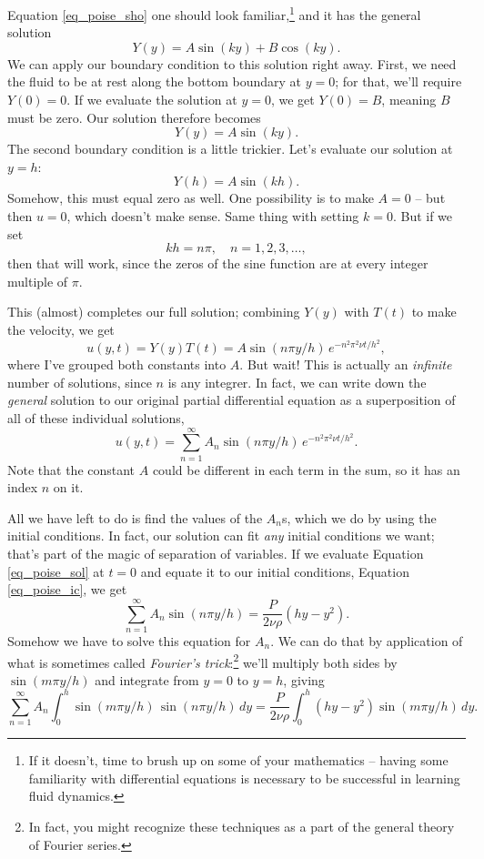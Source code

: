 Equation \ref{eq_poise_sho} one should look familiar,\footnote{If it doesn't, time to brush up on some of your mathematics -- having some familiarity with differential equations is necessary to be successful in learning fluid dynamics.} and it has the general solution
\[
Y(y) = A \sin (ky) + B \cos (ky).
\]
We can apply our boundary condition to this solution right away.  First, we need the fluid to be at rest along the bottom boundary at $y=0$; for that, we'll require $Y(0) = 0$.  If we evaluate the solution at $y=0$, we get $Y(0) = B$, meaning $B$ must be zero.  Our solution therefore becomes
\[
Y(y) = A \sin (ky).
\]
The second boundary condition is a little trickier.  Let's evaluate our solution at $y = h$:
\[
Y(h) = A \sin(kh).
\]
Somehow, this must equal zero as well.  One possibility is to make $A = 0$ -- but then $u = 0$, which doesn't make sense.  Same thing with setting $k = 0$.  But if we set 
\[
kh = n\pi, \quad n = 1, 2, 3, \dots,
\]
then that will work, since the zeros of the sine function are at every integer multiple of $\pi$.

This (almost) completes our full solution; combining $Y(y)$ with $T(t)$ to make the velocity, we get
\[
u(y, t) = Y(y)T(t) = A \sin (n\pi y / h) \, e^{-n^2 \pi^2 \nu t / h^2},
\]
where I've grouped both constants into $A$.  But wait!  This is actually an \emph{infinite} number of solutions, since $n$ is any integrer.  In fact, we can write down the \emph{general} solution to our original partial differential equation as a superposition of all of these individual solutions,
\begin{equation}
\label{eq_poise_sol}
u(y, t) = \sum_{n=1}^\infty A_n \sin(n \pi y / h) \, e^{-n^2 \pi^2 \nu t / h^2}.
\end{equation}
Note that the constant $A$ could be different in each term in the sum, so it has an index $n$ on it.

All we have left to do is find the values of the $A_n$s, which we do by using the initial conditions.  In fact, our solution can fit \emph{any} initial conditions we want; that's part of the magic of separation of variables.  If we evaluate Equation \ref{eq_poise_sol} at $t=0$ and equate it to our initial conditions, Equation \ref{eq_poise_ic}, we get
\[
\sum_{n=1}^\infty A_n \sin(n \pi y / h) =  \frac{P}{2\nu \rho} (hy - y^2).
\]
Somehow we have to solve this equation for $A_n$.  We can do that by application of what is sometimes called \emph{Fourier's trick}:\footnote{In fact, you might recognize these techniques as a part of the general theory of Fourier series.} we'll multiply both sides by $\sin(m \pi y/h)$ and integrate from $y=0$ to $y=h$, giving
\begin{equation}
\label{eq_poise_coeff}
\sum_{n=1}^\infty A_n \int_0^h \sin(m\pi y/h) \, \sin(n \pi y / h) \, dy =  \frac{P}{2\nu \rho} \int_0^h (hy - y^2)\sin(m\pi y/h) \, dy.
\end{equation}

